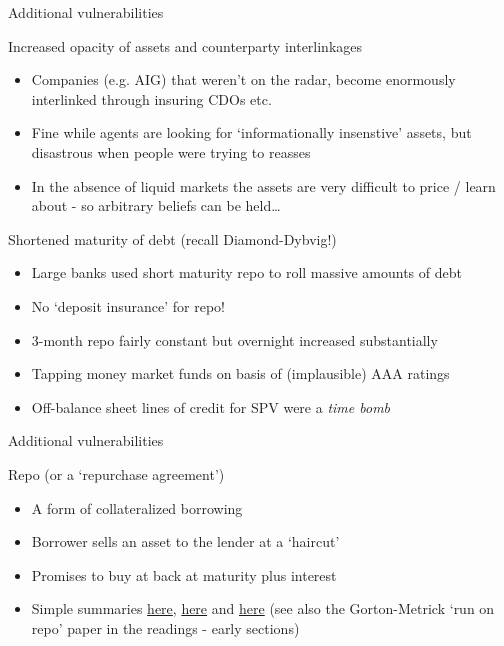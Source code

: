 \begin{frame}{Additional vulnerabilities}

Increased opacity of assets and counterparty interlinkages
	\begin{itemize}
	\item	Companies (e.g. AIG) that weren't on the radar, become enormously interlinked through insuring CDOs etc.
	\item	Fine while agents are looking for `informationally insenstive' assets, but disastrous when people were trying to reasses
	\item	In the absence of liquid markets the assets are very difficult to price / learn about - so arbitrary beliefs can be held\ldots
	\end{itemize}
\vspace{2mm}
Shortened maturity of debt (recall Diamond-Dybvig!)
	\begin{itemize}
	\item	Large banks used short maturity repo to roll massive amounts of debt
	\item	No `deposit insurance' for repo!
	\item	$3$-month repo fairly constant but overnight increased substantially
	\item	Tapping money market funds on basis of (implausible) AAA ratings
	\item	Off-balance sheet lines of credit for SPV were a \textit{time bomb}
	\end{itemize}

\end{frame}



\begin{frame}{Additional vulnerabilities}

Repo (or a `repurchase agreement')
	\begin{itemize}
	\item	A form of collateralized borrowing
	\item	Borrower sells an asset to the lender at a `haircut'
	\item	Promises to buy at back at maturity plus interest
	\item	Simple summaries \href{https://www.investopedia.com/terms/r/repurchaseagreement.asp}{here}, \href{https://en.wikipedia.org/wiki/Repurchase_agreement}{here} and \href{https://www.icmagroup.org/Regulatory-Policy-and-Market-Practice/repo-and-collateral-markets/icma-ercc-publications/frequently-asked-questions-on-repo/3-what-is-the-role-of-repo-in-the-financial-markets/}{here} (see also the Gorton-Metrick `run on repo' paper in the readings - early sections)
	\end{itemize}

\end{frame}

